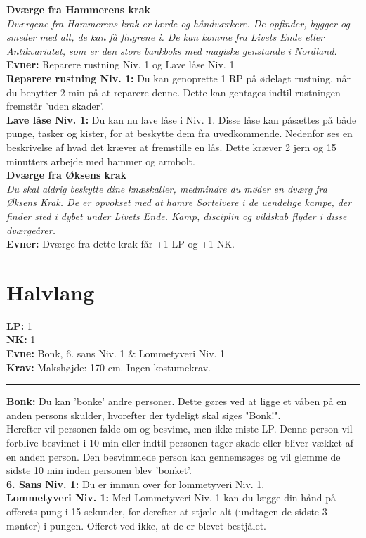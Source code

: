 \textbf{Dværge fra Hammerens krak}\\
\textit{Dværgene fra Hammerens krak er lærde og håndværkere. De opfinder, bygger og smeder med alt, de kan få fingrene i. De kan komme fra Livets Ende eller Antikvariatet, som er den store bankboks med magiske genstande i Nordland.}\\
\textbf{Evner:} Reparere rustning Niv. 1 og Lave låse Niv. 1\\
\textbf{Reparere rustning Niv. 1:} Du kan genoprette 1 RP på ødelagt rustning, når du benytter 2 min på at reparere denne. Dette kan gentages indtil rustningen fremstår 'uden skader'.\\
\textbf{Lave låse Niv. 1:} Du kan nu lave låse i Niv. 1. Disse låse kan påsættes på både punge, tasker og kister, for at beskytte dem fra uvedkommende. Nedenfor ses en beskrivelse af hvad det kræver at fremstille en lås. Dette kræver 2 jern og 15 minutters arbejde med hammer og armbolt.\\


\textbf{Dværge fra Øksens krak}\\
\textit{Du skal aldrig beskytte dine knæskaller, medmindre du møder en dværg fra Øksens Krak. De er opvokset med at hamre Sortelvere i de uendelige kampe, der finder sted i dybet under Livets Ende. Kamp, disciplin og vildskab flyder i disse dværgeårer.}\\
\textbf{Evner:} Dværge fra dette krak får +1 LP og +1 NK.

\section{Halvlang}
\begin{race*}[Halvlange]
\textbf{LP:} 1\\ 
\textbf{NK:} 1\\ 
\textbf{Evne:} Bonk, 6. sans Niv. 1 \& Lommetyveri Niv. 1\\
\textbf{Krav:} Makshøjde: 170 cm. Ingen kostumekrav.\\
\rule{\textwidth}{0.4pt}
\textbf{Bonk:} Du kan 'bonke' andre personer. Dette gøres ved at ligge et våben på en anden persons skulder, hvorefter der tydeligt skal siges "Bonk!".\\
Herefter vil personen falde om og besvime, men ikke miste LP. Denne person vil forblive besvimet i 10 min eller indtil personen tager skade eller bliver vækket af en anden person. Den besvimmede person kan gennemsøges og vil glemme de sidste 10 min inden personen blev 'bonket'.\\
\textbf{6. Sans Niv. 1:} Du er immun over for lommetyveri Niv. 1.\\
\textbf{Lommetyveri Niv. 1:} Med Lommetyveri Niv. 1 kan du lægge din hånd på offerets pung i 15 sekunder, for derefter at stjæle alt (undtagen de sidste 3 mønter) i pungen. Offeret ved ikke, at de er blevet bestjålet.\\
\end{race*}

